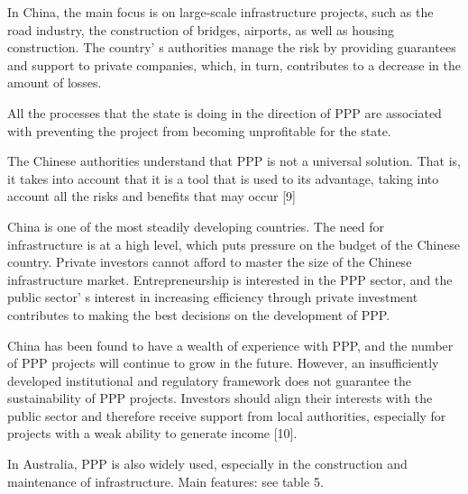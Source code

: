 \begin{multicols}{2}
In China, the main focus is on large-scale infrastructure projects, such
as the road industry, the construction of bridges, airports, as well as
housing construction. The country' s authorities manage
the risk by providing guarantees and support to private companies,
which, in turn, contributes to a decrease in the amount of losses.

All the processes that the state is doing in the direction of PPP are
associated with preventing the project from becoming unprofitable for
the state.

The Chinese authorities understand that PPP is not a universal solution.
That is, it takes into account that it is a tool that is used to its
advantage, taking into account all the risks and benefits that may occur
{[}9{]}

China is one of the most steadily developing countries. The need for
infrastructure is at a high level, which puts pressure on the budget of
the Chinese country. Private investors cannot afford to master the size
of the Chinese infrastructure market. Entrepreneurship is interested in
the PPP sector, and the public sector' s interest in
increasing efficiency through private investment contributes to making
the best decisions on the development of PPP.

China has been found to have a wealth of experience with PPP, and the
number of PPP projects will continue to grow in the future. However, an
insufficiently developed institutional and regulatory framework does not
guarantee the sustainability of PPP projects. Investors should align
their interests with the public sector and therefore receive support
from local authorities, especially for projects with a weak ability to
generate income {[}10{]}.

In Australia, PPP is also widely used, especially in the construction
and maintenance of infrastructure. Main features: see table 5.
\end{multicols}


